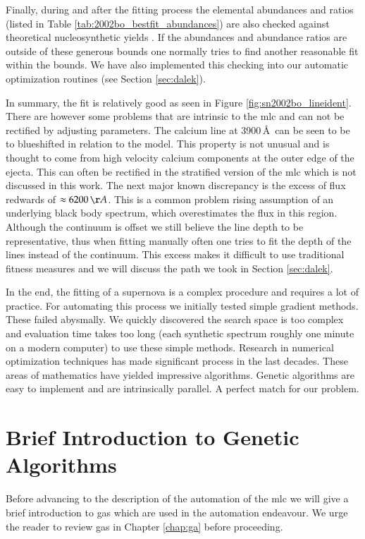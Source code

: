 Finally, during and after the fitting process the elemental abundances and ratios (listed in Table \ref{tab:2002bo_bestfit_abundances}) are also checked against theoretical nucleosynthetic yields \citep[e.g.][]{1999ApJS..125..439I}. If the abundances and abundance ratios are outside of these generous bounds one normally tries to find another reasonable fit within the bounds. We have also implemented this checking into our automatic optimization routines (see Section \ref{sec:dalek}).

In summary, the fit is relatively good as seen in Figure \ref{fig:sn2002bo_lineident}. There are however some problems that are intrinsic to the \gls{mlc} and can not be rectified by adjusting parameters. The calcium line at 3900\,\AA\ can be seen to be to blueshifted in relation to the model. This property is not unusual and is thought to come from high velocity calcium components at the outer edge of the ejecta. This can often be rectified in the stratified version of the \gls{mlc} which is not discussed in this work. The next major known discrepancy is the excess of flux redwards of  $\approx 6200\,\AA$.  This is a common problem rising assumption of an underlying black body spectrum, which overestimates the flux in this region. Although the continuum is offset we still believe the line depth to be representative, thus when fitting manually often one tries to fit the depth of the lines instead of the continuum. This excess makes it difficult to use traditional fitness measures and we will discuss the path we took in Section \ref{sec:dalek}.

In the end, the fitting of a supernova is a complex procedure and requires a lot of practice. For automating this process we initially tested simple gradient methods. These failed abysmally. We quickly discovered the search space is too complex and evaluation time takes too long (each synthetic spectrum roughly one minute on a modern computer) to use these simple methods. Research in numerical optimization techniques has made significant process in the last decades. These areas of mathematics have yielded impressive algorithms. Genetic algorithms are easy to implement and are intrinsically parallel. A perfect match for our problem.

\section{Brief Introduction to Genetic Algorithms}
\label{sec:ga_brief_intro}
Before advancing to the description of the automation of the \gls{mlc} we will give a brief introduction to \glspl{ga} which are used in the automation endeavour.   We urge the reader to review \glspl{ga} in Chapter \ref{chap:ga} before proceeding. 


